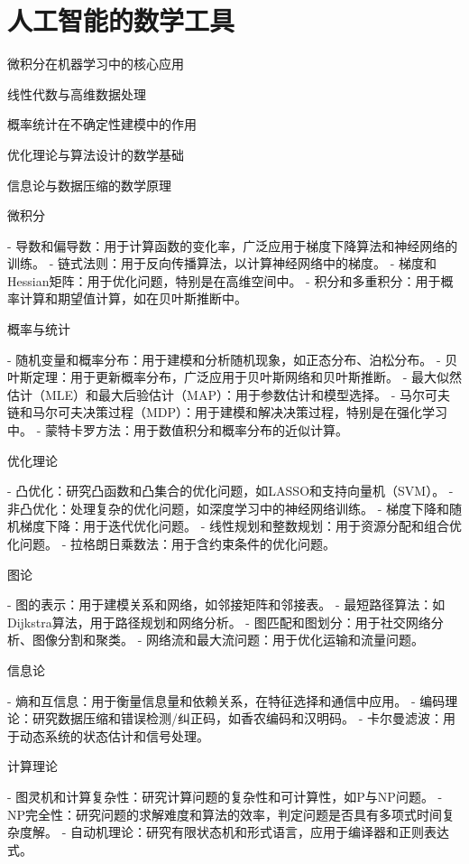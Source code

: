 
\chapter{ 人工智能的数学工具}
 \begin{introduction}
  \item 微积分在机器学习中的核心应用
  \item 线性代数与高维数据处理
  \item 概率统计在不确定性建模中的作用
  \item 优化理论与算法设计的数学基础
  \item 信息论与数据压缩的数学原理
\end{introduction}


微积分

- 导数和偏导数：用于计算函数的变化率，广泛应用于梯度下降算法和神经网络的训练。
- 链式法则：用于反向传播算法，以计算神经网络中的梯度。
- 梯度和Hessian矩阵：用于优化问题，特别是在高维空间中。
- 积分和多重积分：用于概率计算和期望值计算，如在贝叶斯推断中。

概率与统计

- 随机变量和概率分布：用于建模和分析随机现象，如正态分布、泊松分布。
- 贝叶斯定理：用于更新概率分布，广泛应用于贝叶斯网络和贝叶斯推断。
- 最大似然估计（MLE）和最大后验估计（MAP）：用于参数估计和模型选择。
- 马尔可夫链和马尔可夫决策过程（MDP）：用于建模和解决决策过程，特别是在强化学习中。
- 蒙特卡罗方法：用于数值积分和概率分布的近似计算。

优化理论

- 凸优化：研究凸函数和凸集合的优化问题，如LASSO和支持向量机（SVM）。
- 非凸优化：处理复杂的优化问题，如深度学习中的神经网络训练。
- 梯度下降和随机梯度下降：用于迭代优化问题。
- 线性规划和整数规划：用于资源分配和组合优化问题。
- 拉格朗日乘数法：用于含约束条件的优化问题。

图论

- 图的表示：用于建模关系和网络，如邻接矩阵和邻接表。
- 最短路径算法：如Dijkstra算法，用于路径规划和网络分析。
- 图匹配和图划分：用于社交网络分析、图像分割和聚类。
- 网络流和最大流问题：用于优化运输和流量问题。

信息论

- 熵和互信息：用于衡量信息量和依赖关系，在特征选择和通信中应用。
- 编码理论：研究数据压缩和错误检测/纠正码，如香农编码和汉明码。
- 卡尔曼滤波：用于动态系统的状态估计和信号处理。

计算理论

- 图灵机和计算复杂性：研究计算问题的复杂性和可计算性，如P与NP问题。
- NP完全性：研究问题的求解难度和算法的效率，判定问题是否具有多项式时间复杂度解。
- 自动机理论：研究有限状态机和形式语言，应用于编译器和正则表达式。


